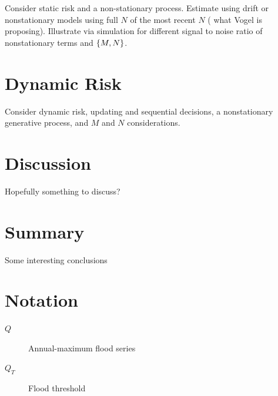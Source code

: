 \documentclass[12pt]{article}
\begin{document}
Consider static risk and a non-stationary process.
Estimate using drift or nonstationary models using full \(N\) of the most recent \(N\) (\ie{} what Vogel is proposing).
Illustrate via simulation for different signal to noise ratio of nonstationary terms and \(\qty{M, N}\).

\section{Dynamic Risk}

Consider dynamic risk, \ie{} updating and sequential decisions, a nonstationary generative process, and \(M\) and \(N\) considerations.

\section{Discussion}

Hopefully something to discuss?

\section{Summary}

Some interesting conclusions

\section{Notation}

\begin{description}
  \item[$Q$] Annual-maximum flood series
  \item[$Q_T$] Flood threshold
\end{description}


\clearpage
\printbibliography{}
\end{document}
